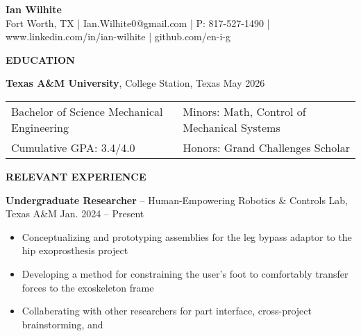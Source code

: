 \documentclass[18pt]{article}
\begin{document}

    \begin{center}
        \LARGE \textbf{Ian Wilhite}\\ 
        \small Fort Worth, TX | Ian.Wilhite0@gmail.com | P: 817-527-1490 | www.linkedin.com/in/ian-wilhite | github.com/en-i-g
        
    \end{center}


    \vspace{-\baselineskip}
    \begin{center}
        \textbf{EDUCATION}
        \hrulefill
    \end{center}
    \vspace{-0.5\baselineskip}


    \textbf{Texas A\&M University}, College Station, Texas \hfill May 2026

    \begin{tabular}{l|l} %
        Bachelor of Science Mechanical Engineering \hspace*{0.5in} & Minors: Math, Control of Mechanical Systems \\ 
        Cumulative GPA: 3.4/4.0 & Honors: Grand Challenges Scholar\\
    \end{tabular}


    \vspace{-0.5\baselineskip}
    \begin{center}
        \textbf{RELEVANT EXPERIENCE}
        \hrulefill
    \end{center}
    \vspace{-0.5\baselineskip}


    \textbf{Undergraduate Researcher} – Human-Empowering Robotics \& Controls Lab, Texas A\&M \hfill Jan. 2024 – Present

    \begin{itemize}[noitemsep]
        \vspace{-0.75\baselineskip}
        \item Conceptualizing and prototyping assemblies for the leg bypass adaptor to the hip exoprosthesis project
        \item Developing a method for constraining the user’s foot to comfortably transfer forces to the exoskeleton frame
        \item Collaberating with other researchers for part interface, cross-project brainstorming, and 
    \end{itemize}
\end{document}
